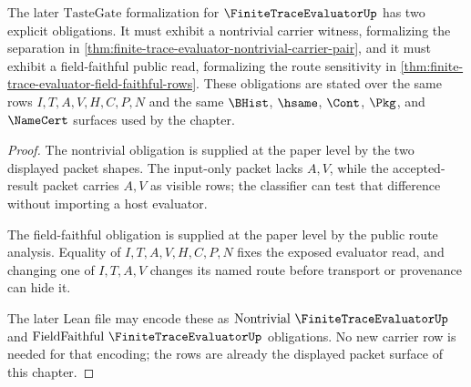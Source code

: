 \begin{theorem}
\label{thm:finite-trace-evaluator-tastegate-readiness}
The later $\mathrm{TasteGate}$ formalization for $\FiniteTraceEvaluatorUp$ has
two explicit obligations. It must exhibit a nontrivial carrier witness,
formalizing the separation in
\autoref{thm:finite-trace-evaluator-nontrivial-carrier-pair}, and it must
exhibit a field-faithful public read, formalizing the route sensitivity in
\autoref{thm:finite-trace-evaluator-field-faithful-rows}. These obligations
are stated over the same rows $I,T,A,V,H,C,P,N$ and the same $\BHist$,
$\hsame$, $\Cont$, $\Pkg$, and $\NameCert$ surfaces used by the chapter.
\end{theorem}
\begin{proof}
The nontrivial obligation is supplied at the paper level by the two displayed
packet shapes. The input-only packet lacks $A,V$, while the accepted-result
packet carries $A,V$ as visible rows; the classifier can test that difference
without importing a host evaluator.

The field-faithful obligation is supplied at the paper level by the public
route analysis. Equality of $I,T,A,V,H,C,P,N$ fixes the exposed evaluator read,
and changing one of $I,T,A,V$ changes its named route before transport or
provenance can hide it.

The later Lean file may encode these as
$\mathrm{Nontrivial}\ \FiniteTraceEvaluatorUp$ and
$\mathrm{FieldFaithful}\ \FiniteTraceEvaluatorUp$ obligations. No new carrier
row is needed for that encoding; the rows are already the displayed packet
surface of this chapter.
\end{proof}


